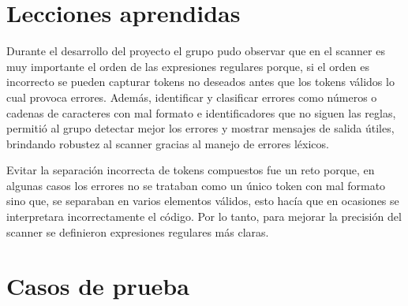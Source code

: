 \documentclass[a4paper,12pt]{article}
\begin{document}
\section*{Lecciones aprendidas}
\begin{flushleft}
	\hspace*{2em} Durante el desarrollo del proyecto el grupo 
	pudo observar que en el scanner es muy importante el orden 
	de las expresiones regulares porque, si el orden es incorrecto 
	se pueden capturar tokens no deseados antes que los tokens 
	válidos lo cual provoca errores. Además, identificar y clasificar 
	errores como números o cadenas de caracteres con mal formato 
	e identificadores que no siguen las reglas, permitió al grupo 
	detectar mejor los errores y mostrar mensajes de salida útiles, 
	brindando robustez al scanner gracias al manejo de errores léxicos.\par
	\vspace{1em}
	\hspace*{2em} Evitar la separación incorrecta de tokens compuestos 
	fue un reto porque, en algunas casos los errores no se trataban como 
	un único token con mal formato sino que, se separaban en varios 
	elementos válidos, esto hacía que en ocasiones se interpretara 
	incorrectamente el código. Por lo tanto, para mejorar la precisión 
	del scanner se definieron expresiones regulares más claras.   \par
	\vspace{1em}
\end{flushleft}

\section*{Casos de prueba}
\end{document}
